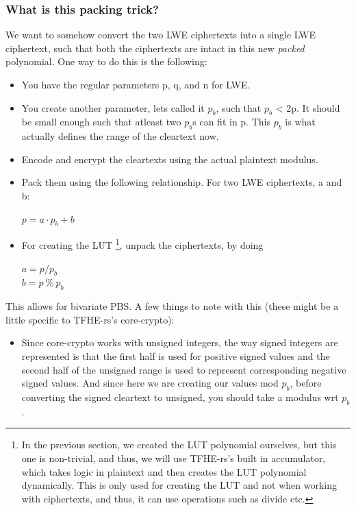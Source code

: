 \documentclass{report}
\begin{document}
\subsubsection{What is this packing trick?}
We want to somehow convert the two LWE ciphertexts into a single LWE ciphertext, such that both the ciphertexts are intact in this new \textit{packed} polynomial. One way to do this is the following:
\begin{itemize}
	\item You have the regular parameters p, q, and n for LWE.
	\item You create another parameter, lets called it $p_b$, such that $p_b$ < 2p. It should be small enough such that atleast two $p_b$s can fit in p. This $p_b$ is what actually defines the range of the cleartext now.
	\item Encode and encrypt the cleartexts using the actual plaintext modulus.
	\item Pack them using the following relationship. For two LWE ciphertexts, a and b:
	\begin{center}
		$p = a \cdot p_b + b$
	\end{center}
	\item For creating the LUT \footnote{In the previous section, we created the LUT polynomial ourselves, but this one is non-trivial, and thus, we will use TFHE-rs's built in accumulator, which takes logic in plaintext and then creates the LUT polynomial dynamically. This is only used for creating the LUT and not when working with ciphertexts, and thus, it can use operations such as divide etc.}, unpack the ciphertexts, by doing
	\begin{center}
		$a = p / p_b$\\
		$b = p \ \% \ p_b$
	\end{center}
\end{itemize}
This allows for bivariate PBS. A few things to note with this (these might be a little specific to TFHE-rs's core-crypto):
\begin{itemize}
	\item Since core-crypto works with unsigned integers, the way signed integers are represented is that the first half is used for positive signed values and the second half of the unsigned range is used to represent corresponding negative signed values. And since here we are creating our values mod $p_b$, before converting the signed cleartext to unsigned, you should take a modulus wrt $p_b$. 
\end{itemize}
\end{document}
